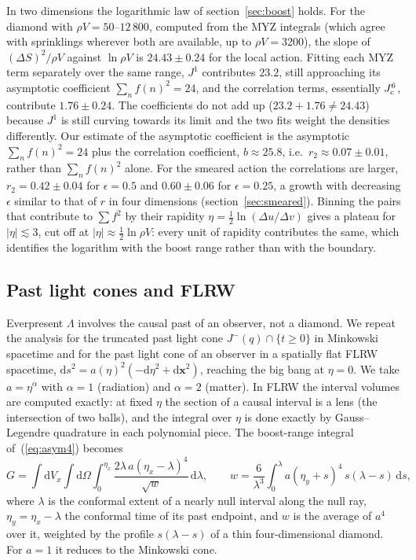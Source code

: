 \documentclass{iopjournal}
\newcommand{\eref}[1]{(\ref{#1})}
\newcommand{\rmd}{\mathrm{d}}
\newcommand{\rhoV}{\rho V}
\newcommand{\Jone}{J^{1}}
\begin{document}
In two dimensions the logarithmic law of section~\ref{sec:boost} holds. For
the diamond with $\rhoV=50$--$12\,800$, computed from the MYZ integrals (which
agree with sprinklings wherever both are available, up to $\rhoV=3200$), the
slope of $(\Delta S)^2/\rhoV$ against $\ln\rhoV$ is $24.43\pm0.24$ for the
local action. Fitting each MYZ term separately over the same range, $\Jone$
contributes $23.2$, still approaching its asymptotic coefficient
$\sum_nf(n)^2=24$, and the correlation terms, essentially $J^6_{\rm c}$,
contribute $1.76\pm0.24$. The coefficients do not add up
($23.2+1.76\ne24.43$) because $\Jone$ is still curving towards its limit and
the two fits weight the densities differently. Our estimate of the asymptotic
coefficient is the asymptotic $\sum_nf(n)^2=24$ plus the correlation
coefficient, $b\approx25.8$, i.e.\ $r_2\approx0.07\pm0.01$, rather than
$\sum_nf(n)^2$ alone. For the
smeared action the correlations are larger, $r_2=0.42\pm0.04$ for
$\epsilon=0.5$ and $0.60\pm0.06$ for $\epsilon=0.25$, a growth with
decreasing $\epsilon$ similar to that of $r$ in four dimensions
(section~\ref{sec:smeared}). Binning the
pairs that contribute to $\sum f^2$ by their rapidity
$\eta=\frac12\ln(\Delta u/\Delta v)$ gives a plateau for $|\eta|\lesssim3$,
cut off at $|\eta|\approx\frac12\ln\rhoV$: every unit of rapidity contributes
the same, which identifies the logarithm with the boost range rather than with
the boundary.

\subsection{Past light cones and FLRW}

Everpresent $\Lambda$ involves the causal past of an observer, not a diamond.
We repeat the analysis for the truncated past light cone
$J^-(q)\cap\{t\ge0\}$ in Minkowski spacetime and for the past light cone of an
observer in a spatially flat FLRW spacetime, $\rmd s^2=a(\eta)^2(-\rmd\eta^2
+\rmd\boldsymbol x^2)$, reaching the big bang at $\eta=0$. We take
$a=\eta^\alpha$ with $\alpha=1$ (radiation) and $\alpha=2$ (matter). In FLRW
the interval volumes are computed exactly: at fixed $\eta$ the section of a
causal interval is a lens (the intersection of two balls), and the integral
over $\eta$ is done exactly by Gauss--Legendre quadrature in each polynomial
piece. The boost-range integral of~\eref{eq:asym4} becomes
\begin{equation}
G=\int\rmd V_x\int\rmd\Omega\int_0^{\eta_x}
\frac{2\lambda\,a(\eta_x-\lambda)^4}{\sqrt{w}}\,\rmd\lambda,\qquad
w=\frac{6}{\lambda^3}\int_0^\lambda a(\eta_y+s)^4\,s(\lambda-s)\,\rmd s,
\label{eq:Gflrw}
\end{equation}
where $\lambda$ is the conformal extent of a nearly null interval along the
null ray, $\eta_y=\eta_x-\lambda$ the conformal time of its past endpoint, and
$w$ is the average of $a^4$ over it, weighted by the profile
$s(\lambda-s)$ of a thin four-dimensional diamond. For $a=1$ it reduces to the
Minkowski cone.
\end{document}
